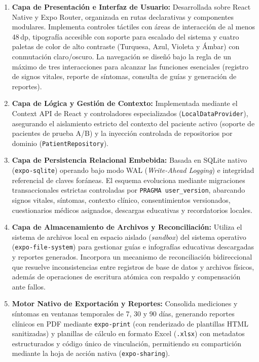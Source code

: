 \begin{enumerate}
    \item \textbf{Capa de Presentación e Interfaz de Usuario:} Desarrollada sobre React Native y Expo Router, organizada en rutas declarativas y componentes modulares. Implementa controles táctiles con áreas de interacción de al menos 48\,dp, tipografía accesible con soporte para escalado del sistema y cuatro paletas de color de alto contraste (Turquesa, Azul, Violeta y Ámbar) con conmutación claro/oscuro. La navegación se diseñó bajo la regla de un máximo de tres interacciones para alcanzar las funciones esenciales (registro de signos vitales, reporte de síntomas, consulta de guías y generación de reportes).
    \item \textbf{Capa de Lógica y Gestión de Contexto:} Implementada mediante el Context API de React y controladores especializados (\texttt{LocalDataProvider}), asegurando el aislamiento estricto del contexto del paciente activo (soporte de pacientes de prueba A/B) y la inyección controlada de repositorios por dominio (\texttt{PatientRepository}).
    \item \textbf{Capa de Persistencia Relacional Embebida:} Basada en SQLite nativo (\texttt{expo-sqlite}) operando bajo modo WAL (\textit{Write-Ahead Logging}) e integridad referencial de claves foráneas. El esquema evoluciona mediante migraciones transaccionales estrictas controladas por \texttt{PRAGMA user\_version}, abarcando signos vitales, síntomas, contexto clínico, consentimientos versionados, cuestionarios médicos asignados, descargas educativas y recordatorios locales.
    \item \textbf{Capa de Almacenamiento de Archivos y Reconciliación:} Utiliza el sistema de archivos local en espacio aislado (\textit{sandbox}) del sistema operativo (\texttt{expo-file-system}) para gestionar guías e infografías educativas descargadas y reportes generados. Incorpora un mecanismo de reconciliación bidireccional que resuelve inconsistencias entre registros de base de datos y archivos físicos, además de operaciones de escritura atómica con respaldo y compensación ante fallos.
    \item \textbf{Motor Nativo de Exportación y Reportes:} Consolida mediciones y síntomas en ventanas temporales de 7, 30 y 90 días, generando reportes clínicos en PDF mediante \texttt{expo-print} (con renderizado de plantillas HTML sanitizadas) y planillas de cálculo en formato Excel (\texttt{.xlsx}) con metadatos estructurados y código único de vinculación, permitiendo su compartición mediante la hoja de acción nativa (\texttt{expo-sharing}).

\end{enumerate}
